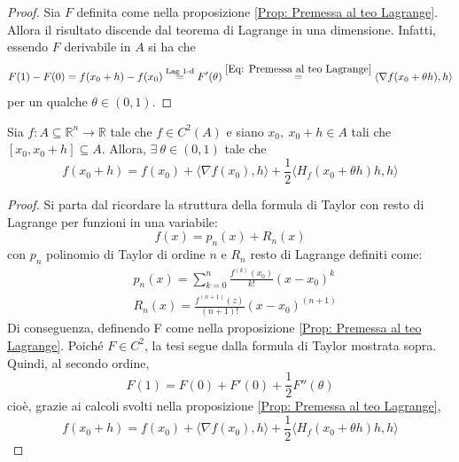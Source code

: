     \begin{proof}
        Sia $F$ definita come nella proposizione \ref{Prop: Premessa al teo Lagrange}. Allora il risultato discende dal teorema di Lagrange in una dimensione. Infatti, essendo $F$ derivabile in $A$ si ha che
        \begin{equation*}
            F(1)-F(0)=f(x_0+h)-f(x_0)\overset{\text{Lag 1-d}}{=}F'(\theta)\overset{\eqref{Eq: Premessa al teo Lagrange}}{=}\langle \nabla f(x_0+ \theta h), h \rangle
        \end{equation*}
        per un qualche $\theta \in (0,1)$.
    \end{proof} 
\begin{theorem} \label{Teo: Taylor con resto di Lagrange}
    Sia $f:A \subseteq \mathbb{R}^n \to \mathbb{R}$ tale che $f\in C^2(A)$ e siano $x_0,\ x_0+h \in A$ tali che $[x_0, x_0+h] \subseteq A$. Allora, $\exists\ \theta \in (0,1)$ tale che
    \begin{equation*}
        f(x_0+h)=f(x_0)+ \langle \nabla f(x_0), h \rangle + \frac{1}{2}\langle H_f(x_0+\theta h)h,h \rangle 
    \end{equation*} 
\end{theorem}
    \begin{proof}
        Si parta dal ricordare la struttura della formula di Taylor con resto di Lagrange per funzioni in una variabile:
        \begin{equation*}
            f(x)=p_n(x)+R_n(x)
        \end{equation*}
        con $p_n$ polinomio di Taylor di ordine $n$ e $R_n$ resto di Lagrange definiti come:
        \begin{equation*}
            \begin{aligned}
                &p_n(x)=\sum\limits_{k=0}^{n}{\frac{f^{(k)}(x_0)}{k!}(x-x_0)^k}\\
                &R_n(x)=\frac{f^{(n+1)}(z)}{(n+1)!}(x-x_0)^{(n+1)}
            \end{aligned}
        \end{equation*}
        Di conseguenza, definendo F come nella proposizione \ref{Prop: Premessa al teo Lagrange}. Poiché $F \in C^2$, la tesi segue dalla formula di Taylor mostrata sopra.
        Quindi, al secondo ordine, 
        \begin{equation*}
            F(1)=F(0)+F'(0)+\frac{1}{2}F''(\theta)
        \end{equation*}
        cioè, grazie ai calcoli svolti nella proposizione \ref{Prop: Premessa al teo Lagrange}, 
        \begin{equation*}
            f(x_0+h)= f(x_0)+\langle \nabla f(x_0), h \rangle + \frac{1}{2}\langle H_f(x_0+ \theta h)h, h\rangle
        \end{equation*}
    \end{proof}
